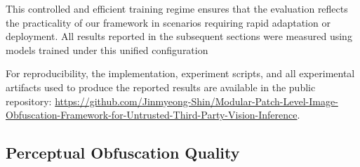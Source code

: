 \documentclass{ieeeaccess}
\newcommand{\rev}[1]{{\color{black}#1}}
\begin{document}
This controlled and efficient training regime ensures that the evaluation reflects the practicality of our framework in scenarios requiring rapid adaptation or deployment. All results reported in the subsequent sections were measured using models trained under this unified configuration

\rev{For reproducibility, the implementation, experiment scripts, and all experimental artifacts used to produce the reported results are available in the public repository: \url{https://github.com/Jinmyeong-Shin/Modular-Patch-Level-Image-Obfuscation-Framework-for-Untrusted-Third-Party-Vision-Inference}.}

\subsection{Perceptual Obfuscation Quality}
\end{document}
